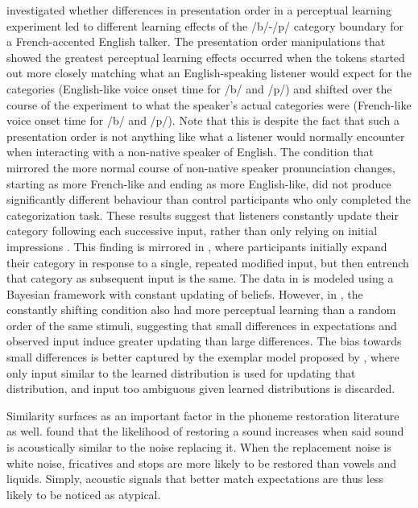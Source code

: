 \citet{Sumner2011} investigated whether differences in presentation order in a perceptual learning experiment led to different learning effects of the /b/-/p/ category boundary for a French-accented English talker. 
The presentation order manipulations that showed the greatest perceptual learning effects occurred when the tokens started out more closely matching what an English-speaking listener would expect for the categories (English-like voice onset time for /b/ and /p/) and shifted over the course of the experiment to what the speaker's actual categories were (French-like voice onset time for /b/ and /p/). Note that this is despite the fact that such a presentation order is not anything like what a listener would normally encounter when interacting with a non-native speaker of English.  
The condition that mirrored the more normal course of non-native speaker pronunciation changes, starting as more French-like and ending as more English-like, did not produce significantly different behaviour than control participants who only completed the categorization task.  
These results suggest that listeners constantly update their category following each successive input, rather than only relying on initial impressions \citep[contra][]{Kraljic2008}.
This finding is mirrored in \citet{Vroomen2007}, where participants initially expand their category in response to a single, repeated modified input, but then entrench that category as subsequent input is the same.
The data in \citet{Vroomen2007} is modeled using a Bayesian framework with constant updating of beliefs.
However, in \citet{Sumner2011}, the constantly shifting condition also had more perceptual learning than a random order of the same stimuli, suggesting that small differences in expectations and observed input induce greater updating than large differences.
The bias towards small differences is better captured by the exemplar model proposed by \citet{Pierrehumbert2001}, where only input similar to the learned distribution is used for updating that distribution, and input too ambiguous given learned distributions is discarded.

Similarity surfaces as an important factor in the phoneme restoration literature as well. \citet{Samuel1981} found that the likelihood of restoring a sound increases when said sound is acoustically similar to the noise replacing it.  
When the replacement noise is white noise, fricatives and stops are more likely to be restored than vowels and liquids.
Simply, acoustic signals that better match expectations are thus less likely to be noticed as atypical.

